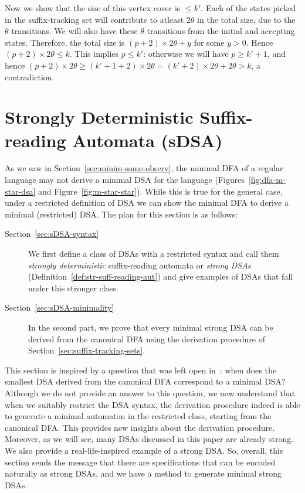   
  Now we show that the size of this vertex cover is $\le k'$.
Each of the states picked in the suffix-tracking set will contribute to atleast $2 \theta$ in the total size, due to the $\theta$ transitions. We will also have these $\theta$ transitions from the initial and accepting states. Therefore, the total size is $(p + 2) \times 2 \theta + y$ for some $y > 0$. Hence $(p + 2) \times 2 \theta \le k$. This implies $p \le k'$: otherwise we will have $p \ge k'+1$, and hence $(p + 2) \times 2 \theta \ge (k' + 1 + 2) \times 2 \theta = (k' + 2) \times 2 \theta + 2 \theta > k$, a contradiction.   


  



\section{Strongly Deterministic Suffix-reading Automata (sDSA)}
\label{sec:strong}

As we saw in Section~\ref{sec:minim-some-observ}, the minimal DFA of a
regular language may not derive a minimal DSA for the language (Figures~\ref{fig:dfa-m-star-dsa} and Figure~\ref{fig:m-star-star}). While this is true for the general case, under a restricted definition of DSA we can show the minimal DFA to derive a minimal (restricted) DSA. The plan for this section is as follows:

\begin{description}
\item[Section~\ref{sec:sDSA-syntax}] We first define a class of DSAs with a restricted syntax and call them \emph{strongly deterministic} suffix-reading automata or \emph{strong DSAs} (Definition~\ref{def:str-suff-reading-aut}) and give examples of DSAs that fall under this stronger class.
\item[Section~\ref{sec:sDSA-minimality}]  In the second part, we prove that every minimal strong DSA can be derived from the canonical DFA using the derivation procedure of Section~\ref{sec:suffix-tracking-sets}.
\end{description}

This section is inspired by a question that was left open in~\cite{DBLP:journals/corr/abs-2410-22761}: when does the smallest DSA derived from the canonical DFA correspond to a minimal DSA? Although we do not provide an answer to this question, we now understand that when we suitably restrict the DSA syntax, the derivation procedure indeed is able to generate a minimal automaton in the restricted class, starting from the canonical DFA. This provides new insights about the derivation procedure. Moreover, as we will see, many DSAs discussed in this paper are already strong. We also provide a real-life-inspired example of a strong DSA. So, overall, this section sends the message that there are specifications that can be encoded naturally as strong DSAs, and we have a method to generate minimal strong DSAs. 

